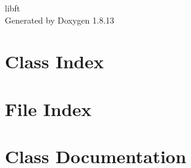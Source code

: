 \documentclass[twoside]{book}
\newcommand{\+}{\discretionary{\mbox{\scriptsize$\hookleftarrow$}}{}{}}
\newcommand{\clearemptydoublepage}{%
  \newpage{\pagestyle{empty}\cleardoublepage}%
}
\begin{document}
\hypersetup{pageanchor=false,
             bookmarksnumbered=true,
             pdfencoding=unicode
            }
\begin{titlepage}
\vspace*{7cm}
\begin{center}%
{\Large libft }\\
\vspace*{1cm}
{\large Generated by Doxygen 1.8.13}\\
\end{center}
\end{titlepage}
\clearemptydoublepage
{}
\tableofcontents
\clearemptydoublepage
{}
\hypersetup{pageanchor=true}

\chapter{Class Index}

\chapter{File Index}

\chapter{Class Documentation}



\end{document}
